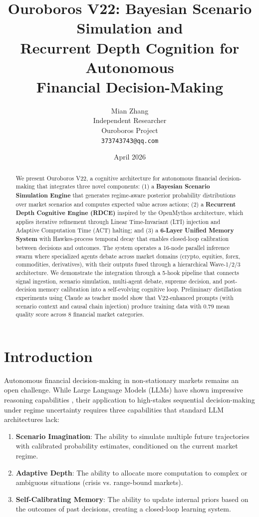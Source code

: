 \documentclass[11pt, a4paper]{article}
\title{\textbf{Ouroboros V22: Bayesian Scenario Simulation and\\Recurrent Depth Cognition for Autonomous\\Financial Decision-Making}}
\author{
  Mian Zhang\\
  Independent Researcher\\
  Ouroboros Project\\
  \texttt{373743743@qq.com}
}
\date{April 2026}
\begin{document}
\maketitle

\begin{abstract}
We present Ouroboros V22, a cognitive architecture for autonomous financial decision-making that integrates three novel components: (1) a \textbf{Bayesian Scenario Simulation Engine} that generates regime-aware posterior probability distributions over market scenarios and computes expected value across actions; (2) a \textbf{Recurrent Depth Cognitive Engine (RDCE)} inspired by the OpenMythos architecture, which applies iterative refinement through Linear Time-Invariant (LTI) injection and Adaptive Computation Time (ACT) halting; and (3) a \textbf{6-Layer Unified Memory System} with Hawkes-process temporal decay that enables closed-loop calibration between decisions and outcomes. The system operates a 16-node parallel inference swarm where specialized agents debate across market domains (crypto, equities, forex, commodities, derivatives), with their outputs fused through a hierarchical Wave-1/2/3 architecture. We demonstrate the integration through a 5-hook pipeline that connects signal ingestion, scenario simulation, multi-agent debate, supreme decision, and post-decision memory calibration into a self-evolving cognitive loop. Preliminary distillation experiments using Claude as teacher model show that V22-enhanced prompts (with scenario context and causal chain injection) produce training data with 0.79 mean quality score across 8 financial market categories.
\end{abstract}

\section{Introduction}

Autonomous financial decision-making in non-stationary markets remains an open challenge. While Large Language Models (LLMs) have shown impressive reasoning capabilities \cite{openai2023gpt4, dubey2024llama3}, their application to high-stakes sequential decision-making under regime uncertainty requires three capabilities that standard LLM architectures lack:

\begin{enumerate}[leftmargin=*]
  \item \textbf{Scenario Imagination}: The ability to simulate multiple future trajectories with calibrated probability estimates, conditioned on the current market regime.
  \item \textbf{Adaptive Depth}: The ability to allocate more computation to complex or ambiguous situations (crisis vs. range-bound markets).
  \item \textbf{Self-Calibrating Memory}: The ability to update internal priors based on the outcomes of past decisions, creating a closed-loop learning system.
\end{enumerate}
\end{document}
